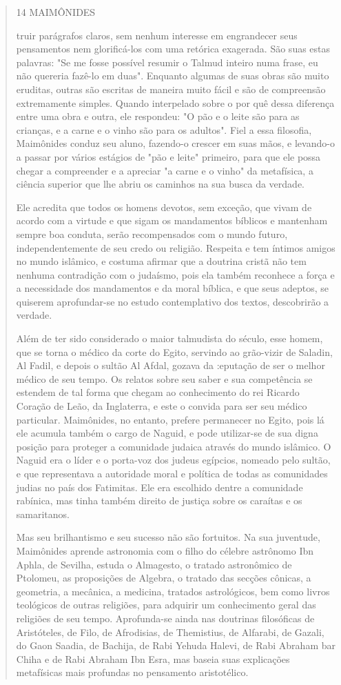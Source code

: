 \begin{quote}
14 MAIMÔNIDES

truir parágrafos claros, sem nenhum interesse em engrandecer seus
pensamen­tos nem glorificá-los com uma retórica exagerada. São suas
estas palavras: "Se me fosse possível resumir o Talmud inteiro numa
frase, eu não quereria fazê-lo em duas". Enquanto algumas de suas obras
são muito eruditas, outras são escri­tas de maneira muito fácil e são de
compreensão extremamente simples. Quan­do interpelado sobre o por quê
dessa diferença entre uma obra e outra, ele res­pondeu: "O pão e o leite
são para as crianças, e a carne e o vinho são para os adultos". Fiel a
essa filosofia, Maimônides conduz seu aluno, fazendo-o crescer em suas
mãos, e levando-o a passar por vários estágios de "pão e leite"
primeiro, para que ele possa chegar a compreender e a apreciar "a carne
e o vinho" da metafísica, a ciência superior que lhe abriu os caminhos
na sua busca da verdade.

Ele acredita que todos os homens devotos, sem exceção, que vivam de
acordo com a virtude e que sigam os mandamentos bíblicos e mantenham
sempre boa conduta, serão recompensados com o mundo futuro,
independen­temente de seu credo ou religião. Respeita e tem íntimos
amigos no mundo islâmico, e costuma afirmar que a doutrina cristã não
tem nenhuma contradi­ção com o judaísmo, pois ela também reconhece a
força e a necessidade dos mandamentos e da moral bíblica, e que seus
adeptos, se quiserem aprofundar-se no estudo contemplativo dos textos,
descobrirão a verdade.

Além de ter sido considerado o maior talmudista do século, esse ho­mem,
que se torna o médico da corte do Egito, servindo ao grão-vizir de
Sala­din, Al Fadil, e depois o sultão Al Afdal, gozava da :eputação de
ser o melhor médico de seu tempo. Os relatos sobre seu saber e sua
competência se esten­dem de tal forma que chegam ao conhecimento do rei
Ricardo Coração de Leão, da Inglaterra, e este o convida para ser seu
médico particular. Maimônides, no entanto, prefere permanecer no Egito,
pois lá ele acumula também o cargo de Naguid, e pode utilizar-se de sua
digna posição para proteger a comunidade ju­daica através do mundo
islâmico. O Naguid era o líder e o porta-voz dos judeus egípcios,
nomeado pelo sultão, e que representava a autoridade moral e políti­ca
de todas as comunidades judias no país dos Fatimitas. Ele era escolhido
den­tre a comunidade rabínica, mas tinha também direito de justiça sobre
os caraí­tas e os samaritanos.

Mas seu brilhantismo e seu sucesso não são fortuitos. Na sua juven­tude,
Maimônides aprende astronomia com o filho do célebre astrônomo Ibn
Aphla, de Sevilha, estuda o Almagesto, o tratado astronômico de
Ptolomeu, as proposições de Algebra, o tratado das secções cônicas, a
geometria, a mecâni­ca, a medicina, tratados astrológicos, bem como
livros teológicos de outras re­ligiões, para adquirir um conhecimento
geral das religiões de seu tempo. Apro­funda-se ainda nas doutrinas
filosóficas de Aristóteles, de Filo, de Afrodisias, de Themistius, de
Alfarabi, de Gazali, do Gaon Saadia, de Bachija, de Rabi Ye­huda Halevi,
de Rabi Abraham bar Chiha e de Rabi Abraham Ibn Esra, mas ba­seia suas
explicações metafísicas mais profundas no pensamento aristotélico.


\end{quote}
